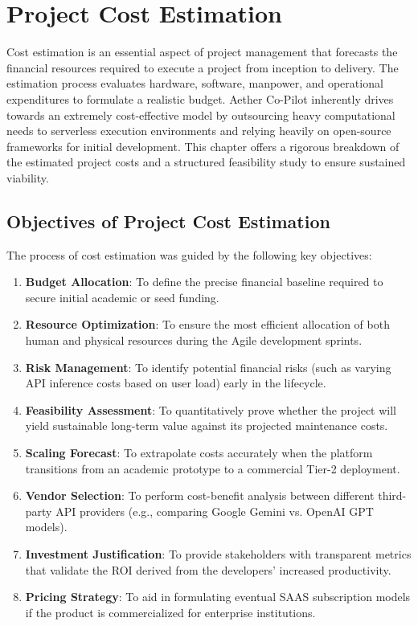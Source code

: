 \chapter{Project Cost Estimation}

Cost estimation is an essential aspect of project management that forecasts the financial resources required to execute a project from inception to delivery. The estimation process evaluates hardware, software, manpower, and operational expenditures to formulate a realistic budget. Aether Co-Pilot inherently drives towards an extremely cost-effective model by outsourcing heavy computational needs to serverless execution environments and relying heavily on open-source frameworks for initial development. This chapter offers a rigorous breakdown of the estimated project costs and a structured feasibility study to ensure sustained viability.

\section{Objectives of Project Cost Estimation}
The process of cost estimation was guided by the following key objectives:
\begin{enumerate}
    \item \textbf{Budget Allocation}: To define the precise financial baseline required to secure initial academic or seed funding.
    \item \textbf{Resource Optimization}: To ensure the most efficient allocation of both human and physical resources during the Agile development sprints.
    \item \textbf{Risk Management}: To identify potential financial risks (such as varying API inference costs based on user load) early in the lifecycle.
    \item \textbf{Feasibility Assessment}: To quantitatively prove whether the project will yield sustainable long-term value against its projected maintenance costs.
    \item \textbf{Scaling Forecast}: To extrapolate costs accurately when the platform transitions from an academic prototype to a commercial Tier-2 deployment.
    \item \textbf{Vendor Selection}: To perform cost-benefit analysis between different third-party API providers (e.g., comparing Google Gemini vs. OpenAI GPT models).
    \item \textbf{Investment Justification}: To provide stakeholders with transparent metrics that validate the ROI derived from the developers' increased productivity.
    \item \textbf{Pricing Strategy}: To aid in formulating eventual SAAS subscription models if the product is commercialized for enterprise institutions.
\end{enumerate}

